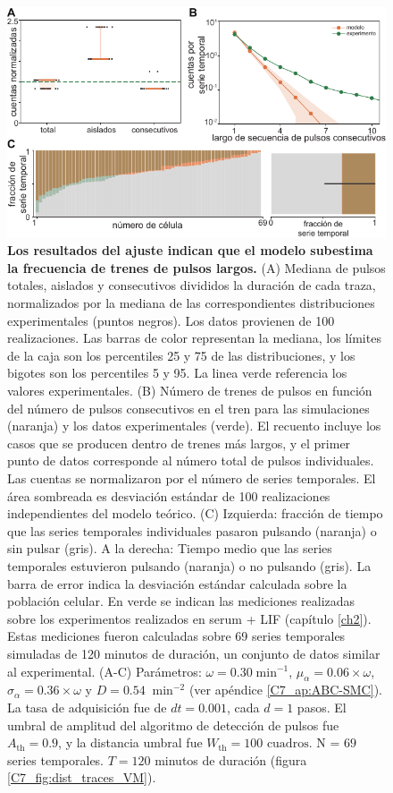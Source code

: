 \documentclass[./main.tex]{subfiles}
\begin{document}
\begin{figure}
    \centering
    \includegraphics[width=1\columnwidth]{figures/chapter7/C7_dist_validation.pdf} 
    \caption{\textbf{Los resultados del ajuste indican que el modelo subestima la frecuencia de trenes de pulsos largos.} (A) Mediana de pulsos totales, aislados y consecutivos divididos la duración de cada traza, normalizados por la mediana de las correspondientes distribuciones experimentales (puntos negros). Los datos provienen de 100 realizaciones. Las barras de color representan la mediana, los límites de la caja son los percentiles 25 y 75 de las distribuciones, y los bigotes son los percentiles 5 y 95. La linea verde referencia los valores experimentales. (B) Número de trenes de pulsos en función del número de pulsos consecutivos en el tren para las simulaciones (naranja) y los datos experimentales (verde). El recuento incluye los casos que se producen dentro de trenes más largos, y el primer punto de datos corresponde al número total de pulsos individuales. Las cuentas se normalizaron por el número de series temporales. El área sombreada es desviación estándar de 100 realizaciones independientes del modelo teórico. (C) Izquierda: fracción de tiempo que las series temporales individuales pasaron pulsando (naranja) o sin pulsar (gris). A la derecha: Tiempo medio que las series temporales estuvieron pulsando (naranja) o no pulsando (gris). La barra de error indica la desviación estándar calculada sobre la población celular. En verde se indican las mediciones realizadas sobre los experimentos realizados en serum + LIF (capítulo \ref{ch2}). Estas mediciones fueron calculadas sobre 69 series temporales simuladas de 120 minutos de duración, un conjunto de datos similar al experimental. (A-C) Parámetros:  $\omega = 0.30 \; \text{min}^{-1}$, $\mu_{\alpha} = 0.06 \times \omega$, $ \sigma_{\alpha} = 0.36 \times \omega$ y $D = 0.54 \;  \; \text{min}^{-2}$ (ver apéndice \ref{C7_ap:ABC-SMC}). La tasa de adquisición fue de $dt = 0.001$, cada $d = 1$ pasos. El umbral de amplitud del algoritmo de detección de pulsos fue $A_{\text{th}} = 0.9$, y la distancia umbral fue $W_{\text{th}} = 100\text{ cuadros}$. N = $69$ series temporales. $T = 120$ minutos de duración (figura \ref{C7_fig:dist_traces_VM}).}
    \label{C7_fig:dist_param_evaluation}
\end{figure} 
\end{document}
